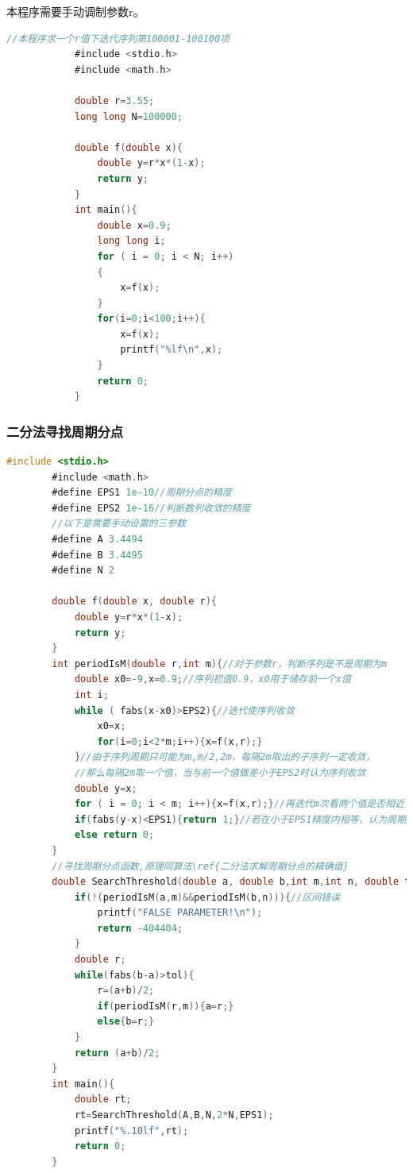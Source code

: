 \documentclass[10pt, a4paper]{article}
\begin{document}
        本程序需要手动调制参数r。
        \begin{lstlisting}[language=C]
            //本程序求一个r值下迭代序列第100001-100100项
            #include <stdio.h>
            #include <math.h>
            
            double r=3.55;
            long long N=100000;
            
            double f(double x){
                double y=r*x*(1-x);
                return y;
            }
            int main(){
                double x=0.9;
                long long i;
                for ( i = 0; i < N; i++)
                {
                    x=f(x);
                }
                for(i=0;i<100;i++){
                    x=f(x);
                    printf("%lf\n",x);
                } 
                return 0;
            }
        \end{lstlisting}
    \subsubsection{二分法寻找周期分点}
    \begin{lstlisting}[language=C]
        #include <stdio.h>
        #include <math.h>
        #define EPS1 1e-10//周期分点的精度
        #define EPS2 1e-16//判断数列收敛的精度
        //以下是需要手动设置的三参数
        #define A 3.4494
        #define B 3.4495
        #define N 2

        double f(double x, double r){
            double y=r*x*(1-x);
            return y;
        }
        int periodIsM(double r,int m){//对于参数r，判断序列是不是周期为m
            double x0=-9,x=0.9;//序列初值0.9，x0用于储存前一个x值
            int i;
            while ( fabs(x-x0)>EPS2){//迭代使序列收敛
                x0=x;
                for(i=0;i<2*m;i++){x=f(x,r);}
            }//由于序列周期只可能为m,m/2,2m，每隔2m取出的子序列一定收敛，
            //那么每隔2m取一个值，当与前一个值做差小于EPS2时认为序列收敛
            double y=x;
            for ( i = 0; i < m; i++){x=f(x,r);}//再迭代m次看两个值是否相近
            if(fabs(y-x)<EPS1){return 1;}//若在小于EPS1精度内相等，认为周期为m
            else return 0;
        }
        //寻找周期分点函数,原理同算法\ref{二分法求解周期分点的精确值}
        double SearchThreshold(double a, double b,int m,int n, double tol){
            if(!(periodIsM(a,m)&&periodIsM(b,n))){//区间错误
                printf("FALSE PARAMETER!\n");
                return -404404;
            }
            double r;
            while(fabs(b-a)>tol){
                r=(a+b)/2;
                if(periodIsM(r,m)){a=r;}
                else{b=r;}
            }
            return (a+b)/2;
        }
        int main(){
            double rt;
            rt=SearchThreshold(A,B,N,2*N,EPS1);
            printf("%.10lf",rt);
            return 0;
        }
    \end{lstlisting}
\end{document}
